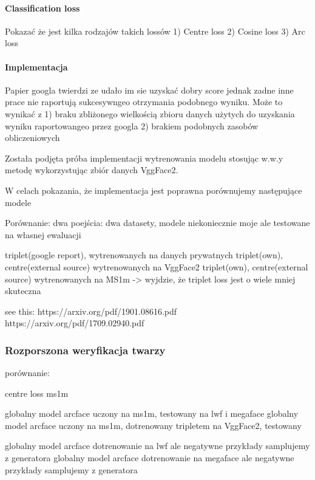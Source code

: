 \paragraph{Classification loss}
Pokazać że jest kilka rodzajów takich lossów
1) Centre loss
2) Cosine loss
3) Arc loss



\paragraph{Implementacja}
Papier googla twierdzi ze udało im sie uzyskać dobry score jednak zadne inne prace nie
raportują sukcesywngeo otrzymania podobnego wyniku. Może to wynikać z 1) braku zbliżonego
wielkością zbioru danych użytych do uzyskania wyniku raportowangeo przez googla 2) brakiem
podobnych zasobów obliczeniowych

Została podjęta próba implementacji wytrenowania modelu stosując w.w.y metodę wykorzystując zbiór danych VggFace2. 

W celach pokazania, że implementacja jest poprawna porównujemy następujące modele

Porównanie:
dwa poejścia: dwa datasety, modele niekoniecznie moje ale testowane na własnej ewaluacji

 triplet(google report), wytrenowanych na danych prywatnych
 triplet(own), centre(external source) wytrenowanych na VggFace2
 triplet(own), centre(external source) wytrenowanych na MS1m
-> wyjdzie, że triplet loss jest o wiele mniej skuteczna 

see this:
https://arxiv.org/pdf/1901.08616.pdf
https://arxiv.org/pdf/1709.02940.pdf



\subsubsection{Rozporszona weryfikacja twarzy}
porównanie:

centre loss ms1m


globalny model arcface uczony na ms1m, testowany na lwf i megaface
globalny model arcface uczony na ms1m, dotrenowany tripletem na VggFace2, testowany


globalny model arcface dotrenowanie na lwf ale negatywne przykłady samplujemy z generatora
globalny model arcface dotrenowanie na megaface ale negatywne przykłady samplujemy z generatora



